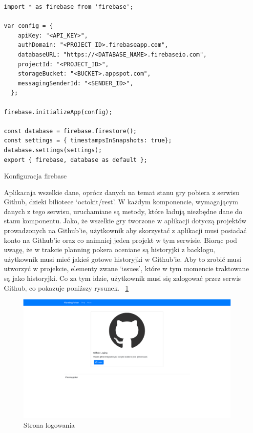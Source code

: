 \begin{listing}
	\begin{verbatim}
import * as firebase from 'firebase';

var config = {
    apiKey: "<API_KEY>",
    authDomain: "<PROJECT_ID>.firebaseapp.com",
    databaseURL: "https://<DATABASE_NAME>.firebaseio.com",
    projectId: "<PROJECT_ID>",
    storageBucket: "<BUCKET>.appspot.com",
    messagingSenderId: "<SENDER_ID>",
  };

firebase.initializeApp(config);

const database = firebase.firestore();
const settings = { timestampsInSnapshots: true};
database.settings(settings);
export { firebase, database as default };
	\end{verbatim}
	\caption{Konfiguracja firebase} \label{listing:firebaseConfig}
\end{listing}

Aplikacaja wszelkie dane, oprócz danych na temat stanu gry pobiera z serwisu Github,
dzieki biliotece `octokit/rest'.  W każdym komponencie, wymagającym danych z tego serwisu,
uruchamiane są metody, które ładują niezbędne dane do stanu komponentu.
Jako, że wszelkie gry tworzone w aplikacji dotyczą projektów prowadzonych na Github'ie,
użytkownik aby skorzystać z aplikacji musi posiadać konto na Github'ie oraz co naimniej jeden projekt
w tym serwisie. Biorąc pod uwagę, że w trakcie planning pokera oceniane są historyjki z backlogu,
użytkownik musi mieć jakieś gotowe historyjki w Github'ie. Aby to zrobić musi utworzyć w projekcie,
elementy zwane `issues', które w tym momencie traktowane są jako historyjki.
Co za tym idzie, użytkownik musi się zalogować przez serwis Github, co pokazuje poniższy rysunek.
~\ref{rys:login} 

\begin{figure}[H]
	\centering\includegraphics[width=.7\textwidth]{img/GitLogin}
	\caption{Strona logowania}\label{rys:login}%
\end{figure}

